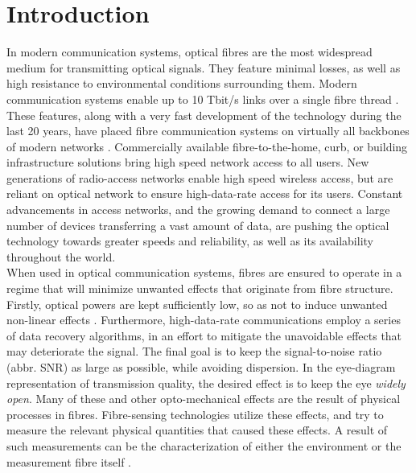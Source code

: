 \documentclass{standalone}
\begin{document}
\chapter{Introduction}
\setcounter{page}\thestranica


In modern communication systems, optical fibres are the most widespread medium for transmitting optical signals. They feature minimal losses, as well as high resistance to environmental conditions surrounding them. Modern communication systems enable up to 10 Tbit/s links over a single fibre thread \cite{Hecht2015}. These features, along with a very fast development of the technology during the last 20 years, have placed fibre communication systems on virtually all backbones of modern networks \cite{fer:omre}. Commercially available fibre-to-the-home, curb, or building infrastructure solutions bring high speed network access to all users. New generations of radio-access networks enable high speed wireless access, but are reliant on optical network to ensure high-data-rate access for its users. Constant advancements in access networks, and the growing demand to connect a large number of devices transferring a vast amount of data, are pushing the optical technology towards greater speeds and reliability, as well as its availability throughout the world. \\

When used in optical communication systems, fibres are ensured to operate in a regime that will minimize unwanted effects that originate from fibre structure. Firstly, optical powers are kept sufficiently low, so as not to induce unwanted non-linear effects \cite{agrawal2005lightwave}. Furthermore, high-data-rate communications employ a series of data recovery algorithms, in an effort to mitigate the unavoidable effects that may deteriorate the signal. The final goal is to keep the signal-to-noise ratio (abbr. SNR) as large as possible, while avoiding dispersion. In the eye-diagram representation of transmission quality, the desired effect is to keep the eye \textit{widely open}. Many of these and other opto-mechanical effects are the result of physical processes in fibres. Fibre-sensing technologies utilize these effects, and try to measure the relevant physical quantities that caused these effects. A result of such measurements can be the characterization of either the environment or the measurement fibre itself \cite{krohnFundamentals}. \\
\end{document}
